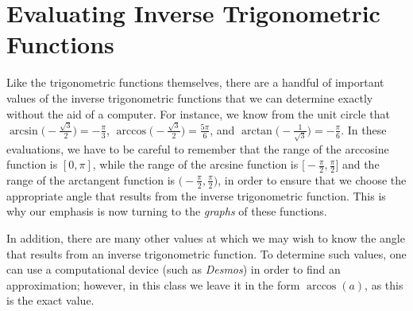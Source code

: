 \documentclass{ximera}
\begin{document}
\section{Evaluating Inverse Trigonometric Functions}
%
Like the trigonometric functions themselves, there are a handful of important values of the inverse trigonometric functions that we can determine exactly without the aid of a computer. For instance, we know from the unit circle that $\arcsin\!\Big(-\frac{\sqrt{3}}{2}\Big) = -\frac{\pi}{3}$, $\arccos\!\Big(-\frac{\sqrt{3}}{2}\Big) = \frac{5\pi}{6}$, and $\arctan\!\Big(-\frac{1}{\sqrt{3}}\Big) = -\frac{\pi}{6}$.  In these evaluations, we have to be careful to remember that the range of the arccosine function is $[0,\pi]$, while the range of the arcsine function is $\Big[-\frac{\pi}{2},\frac{\pi}{2}\Big]$ and the range of the arctangent function is $\Big(-\frac{\pi}{2},\frac{\pi}{2}\Big)$, in order to ensure that we choose the appropriate angle that results from the inverse trigonometric function. This is why our emphasis is now turning to the {\it graphs} of these functions. 
%
\par
%
In addition, there are many other values at which we may wish to know the angle that results from an inverse trigonometric function. To determine such values, one can use a computational device (such as \emph{Desmos}) in order to find an approximation; however, in this class we leave it in the form $\arccos(a)$, as this is the exact value.%
\end{document}
